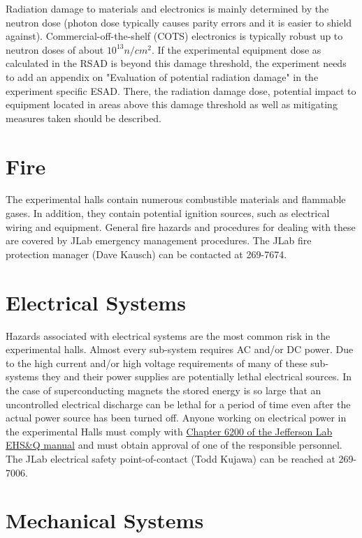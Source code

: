 Radiation damage to materials and electronics is mainly determined by the neutron 
dose (photon dose typically causes parity errors and it is easier to shield against). 
Commercial-off-the-shelf (COTS) electronics is typically robust up to neutron 
doses of about $10^{13} n/cm^2$. If the experimental equipment dose as calculated 
in the RSAD is beyond this damage threshold, the experiment needs to add 
an appendix on "Evaluation of potential radiation damage" in the experiment 
specific ESAD. There, the radiation damage dose, potential impact to equipment 
located in areas above this damage threshold as well as mitigating measures taken should be described.

\section{Fire}

	The experimental halls contain numerous combustible materials and flammable gases. 
In addition, they contain potential ignition sources, such as electrical wiring and equipment. 
General fire hazards and procedures for dealing with these are covered by JLab emergency 
management procedures. The JLab fire protection manager (Dave Kausch) can be contacted at 269-7674.

\section{Electrical Systems}

	Hazards associated with electrical systems are the most common risk in the experimental halls. 
Almost every sub-system requires AC and/or DC power. Due to the high current and/or high voltage 
requirements of many of these sub-systems they and their power supplies are potentially lethal 
electrical sources. In the case of superconducting magnets the stored energy is so large that 
an uncontrolled electrical discharge can be lethal for a period of time even after the actual 
power source has been turned off.  Anyone working on electrical power in the experimental Halls 
must comply with \href{http://www.jlab.org/ehs/ehsmanual/manual/6200.html}{Chapter 6200 of the Jefferson Lab EHS\&Q manual}
and must obtain approval of one of the responsible personnel. 
The JLab electrical safety point-of-contact (Todd Kujawa) can be reached at 269-7006.

\section{Mechanical Systems}

